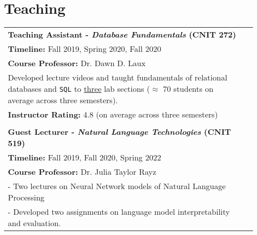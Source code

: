 \documentclass[11pt]{article}
\begin{document}
\renewcommand*{\arraystretch}{1}
\section*{Teaching}
\begin{tabularx}{\textwidth}{@{}p{}l}
\large \textbf{Teaching Assistant - \textit{Database Fundamentals} (CNIT 272)}\\
\textbf{Timeline:} Fall 2019, Spring 2020, Fall 2020\\
\textbf{Course Professor:} Dr. Dawn D. Laux\\
Developed lecture videos and taught fundamentals of relational databases and \texttt{SQL} to \underline{three} lab sections ($\approx$ 70 students on average across three semesters).\\
\textbf{Instructor Rating:} 4.8 (on average across three semesters)\\\\

\large \textbf{Guest Lecturer - \textit{Natural Language Technologies} (CNIT 519)}\\
\textbf{Timeline:} Fall 2019, Fall 2020, Spring 2022\\
\textbf{Course Professor:} Dr. Julia Taylor Rayz\\
- Two lectures on Neural Network models of Natural Language Processing\\
- Developed two assignments on language model interpretability and evaluation.
\end{tabularx}

\end{document}
